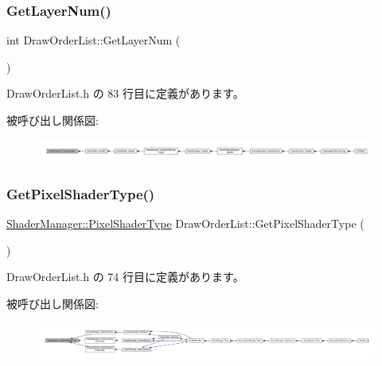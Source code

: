 \subsubsection{\texorpdfstring{Get\+Layer\+Num()}{GetLayerNum()}}
{\footnotesize\ttfamily int Draw\+Order\+List\+::\+Get\+Layer\+Num (\begin{DoxyParamCaption}{ }\end{DoxyParamCaption})\hspace{0.3cm}{\ttfamily [inline]}}



 Draw\+Order\+List.\+h の 83 行目に定義があります。

被呼び出し関係図\+:
\nopagebreak
\begin{figure}[H]
\begin{center}
\leavevmode
\includegraphics[width=350pt]{class_draw_order_list_a28c14812ea793a3f3d752d58ccb481b2_icgraph}
\end{center}
\end{figure}
\mbox{\label{class_draw_order_list_ab5f9a610bc9304a701d0f1fbaa3292fa}} 
\subsubsection{\texorpdfstring{Get\+Pixel\+Shader\+Type()}{GetPixelShaderType()}}
{\footnotesize\ttfamily \mbox{\hyperlink{class_shader_manager_a7d15d773b3c6a99dd7086c45c8b0be5f}{Shader\+Manager\+::\+Pixel\+Shader\+Type}} Draw\+Order\+List\+::\+Get\+Pixel\+Shader\+Type (\begin{DoxyParamCaption}{ }\end{DoxyParamCaption})\hspace{0.3cm}{\ttfamily [inline]}}



 Draw\+Order\+List.\+h の 74 行目に定義があります。

被呼び出し関係図\+:
\nopagebreak
\begin{figure}[H]
\begin{center}
\leavevmode
\includegraphics[width=350pt]{class_draw_order_list_ab5f9a610bc9304a701d0f1fbaa3292fa_icgraph}
\end{center}
\end{figure}
\mbox{\label{class_draw_order_list_aff90f57ce3ff0e2d7cd715267bfe024f}} 
